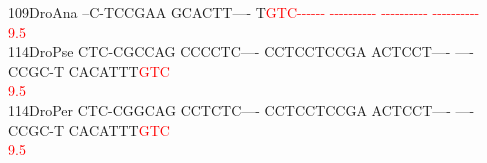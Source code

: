 \documentclass[11pt,twoside,reqno,a4paper]{article}
\begin{document}
{109\hspace*{1\charwidth}DroAna	--C-TCCGAA	GCACTT----	T\textcolor{Red}{G}\textcolor{Red}{T}\textcolor{Red}{C}\textcolor{Red}{-}\textcolor{Red}{-}\textcolor{Red}{-}\textcolor{Red}{-}\textcolor{Red}{-}\textcolor{Red}{-}	\textcolor{Red}{-}\textcolor{Red}{-}\textcolor{Red}{-}\textcolor{Red}{-}\textcolor{Red}{-}\textcolor{Red}{-}\textcolor{Red}{-}\textcolor{Red}{-}\textcolor{Red}{-}\textcolor{Red}{-}	\textcolor{Red}{-}\textcolor{Red}{-}\textcolor{Red}{-}\textcolor{Red}{-}\textcolor{Red}{-}\textcolor{Red}{-}\textcolor{Red}{-}\textcolor{Red}{-}\textcolor{Red}{-}\textcolor{Red}{-}	\textcolor{Red}{-}\textcolor{Red}{-}\textcolor{Red}{-}\textcolor{Red}{-}\textcolor{Red}{-}\textcolor{Red}{-}\textcolor{Red}{-}\textcolor{Red}{-}\textcolor{Red}{-}\textcolor{Red}{-}	\\
\hspace*{4\charwidth}\hspace*{7\charwidth}\hspace*{1\charwidth}\hspace*{1\charwidth}\hspace*{21\charwidth}\textcolor{Red}{9.5}\hspace*{1\charwidth}\hspace*{1\charwidth}\hspace*{1\charwidth}\hspace*{1\charwidth}\\
114\hspace*{1\charwidth}DroPse	CTC-CGCCAG	CCCCTC----	CCTCCTCCGA	ACTCCT----	----CCGC-T	CACATTT\textcolor{Red}{G}\textcolor{Red}{T}\textcolor{Red}{C}	\\
\hspace*{4\charwidth}\hspace*{7\charwidth}\hspace*{1\charwidth}\hspace*{1\charwidth}\hspace*{1\charwidth}\hspace*{1\charwidth}\hspace*{1\charwidth}\hspace*{57\charwidth}\textcolor{Red}{9.5}\hspace*{1\charwidth}\\
114\hspace*{1\charwidth}DroPer	CTC-CGGCAG	CCTCTC----	CCTCCTCCGA	ACTCCT----	----CCGC-T	CACATTT\textcolor{Red}{G}\textcolor{Red}{T}\textcolor{Red}{C}	\\
\hspace*{4\charwidth}\hspace*{7\charwidth}\hspace*{1\charwidth}\hspace*{1\charwidth}\hspace*{1\charwidth}\hspace*{1\charwidth}\hspace*{1\charwidth}\hspace*{57\charwidth}\textcolor{Red}{9.5}\hspace*{1\charwidth}\\
}
\end{document}
